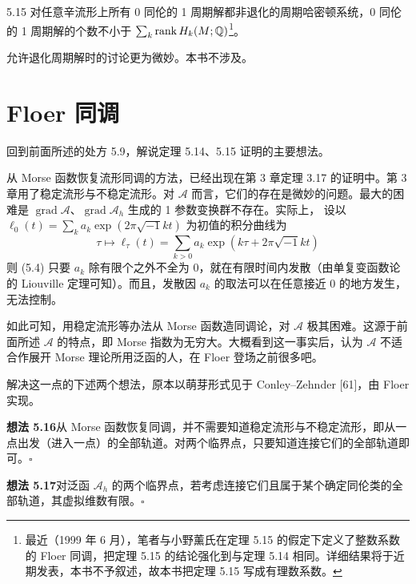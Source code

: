 \begin{theorem}{5.15}
  对任意辛流形上所有 0 同伦的 1 周期解都非退化的周期哈密顿系统，0 同伦的 1 周期解的个数不小于 $\sum_k\operatorname{rank} H_k(M;\mathbb{Q})$\footnote{最近（1999 年 6 月），笔者与小野薰氏在定理 5.15 的假定下定义了整数系数的 Floer 同调，把定理 5.15 的结论强化到与定理 5.14 相同。详细结果将于近期发表，本书不予叙述，故本书把定理 5.15 写成有理数系数。}。
\end{theorem}

允许退化周期解时的讨论更为微妙。本书不涉及。

\section{Floer 同调}


回到前面所述的处方 5.9，解说定理 5.14、5.15 证明的主要想法。

从 Morse 函数恢复流形同调的方法，已经出现在第 3 章定理 3.17 的证明中。第 3 章用了稳定流形与不稳定流形。对 $\mathcal{A}$ 而言，它们的存在是微妙的问题。最大的困难是 $\operatorname{grad}\mathcal{A}$、$\operatorname{grad}\mathcal{A}_h$ 生成的 1 参数变换群不存在。实际上，
设以 $\ell_0(t)=\sum_ka_k\exp(2\pi\sqrt{-1}kt)$ 为初值的积分曲线为
\begin{equation}
  \tau\mapsto\ell_\tau(t)=\sum_{k>0}a_k\exp(k\tau+2\pi\sqrt{-1}kt) \tag{5.4}
\end{equation}
则 (5.4) 只要 $a_k$ 除有限个之外不全为 0，就在有限时间内发散（由单复变函数论的 Liouville 定理可知）。而且，发散因 $a_k$ 的取法可以在任意接近 0 的地方发生，无法控制。

如此可知，用稳定流形等办法从 Morse 函数造同调论，对 $\mathcal{A}$ 极其困难。这源于前面所述 $\mathcal{A}$ 的特点，即 Morse 指数为无穷大。大概看到这一事实后，认为 $\mathcal{A}$ 不适合作展开 Morse 理论所用泛函的人，在 Floer 登场之前很多吧。

解决这一点的下述两个想法，原本以萌芽形式见于 Conley–Zehnder [61]，由 Floer 实现。

\textbf{想法 5.16}\quad 从 Morse 函数恢复同调，并不需要知道稳定流形与不稳定流形，即从一点出发（进入一点）的全部轨道。对两个临界点，只要知道连接它们的全部轨道即可。\hfill$\square$

\textbf{想法 5.17}\quad 对泛函 $\mathcal{A}_h$ 的两个临界点，若考虑连接它们且属于某个确定同伦类的全部轨道，其虚拟维数有限。\hfill$\square$

